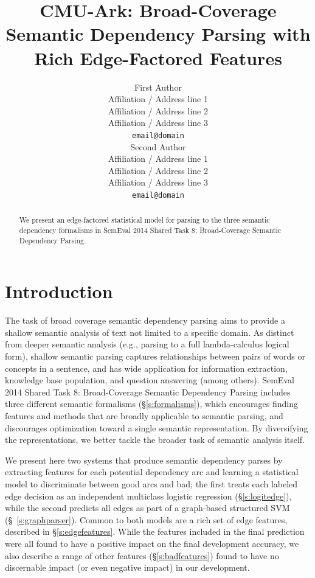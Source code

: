 \documentclass[11pt]{article}
\title{CMU-Ark: Broad-Coverage Semantic Dependency Parsing with Rich
Edge-Factored Features \sam{better title, please}}
\author{First Author \\
  Affiliation / Address line 1 \\
  Affiliation / Address line 2 \\
  Affiliation / Address line 3 \\
  {\tt email@domain} \\\And
  Second Author \\
  Affiliation / Address line 1 \\
  Affiliation / Address line 2 \\
  Affiliation / Address line 3 \\
  {\tt email@domain} \\}
\date{}
\begin{document}
\maketitle

\begin{abstract}
We present an edge-factored statistical model for parsing to the three semantic
dependency formalisms in SemEval 2014 Shared Task 8: Broad-Coverage Semantic
Dependency Parsing.

\end{abstract}



\section{Introduction}

The task of broad coverage semantic dependency parsing aims to provide a
shallow semantic analysis of text not limited to a specific domain.
As distinct from deeper semantic analysis (e.g., parsing to a full
lambda-calculus logical form), shallow semantic parsing captures relationships
between pairs of words or concepts in a sentence, and has wide application for
information extraction, knowledge base population, and question answering (among others).
SemEval 2014 Shared Task 8: Broad-Coverage Semantic Dependency
Parsing \cite{oepens_broad_2014} includes three different semantic
formalisms (\S\ref{s:formalisms}), which encourages finding features and methods
that are broadly applicable to semantic parsing, and discourages optimization
toward a single semantic representation.
By diversifying the representations, we better tackle the broader task of
semantic analysis itself.

We present here two systems that produce semantic dependency parses by extracting
features for each potential dependency arc and learning a statistical model to
discriminate between good arcs and bad;
the first treats each labeled edge decision as an independent multiclass
logistic regression (\S\ref{s:logitedge}), while the second predicts all edges
as part of a graph-based structured SVM (\S~\ref{s:graphparser}). 
Common to both models are a rich set of edge features, described in
\S\ref{s:edgefeatures}.
While the features included in the final prediction were all found to have a
positive impact on the final development accuracy, we also describe a range of
other features (\S\ref{s:badfeatures}) found to have no discernable impact (or
even negative impact) in our development.
\end{document}
